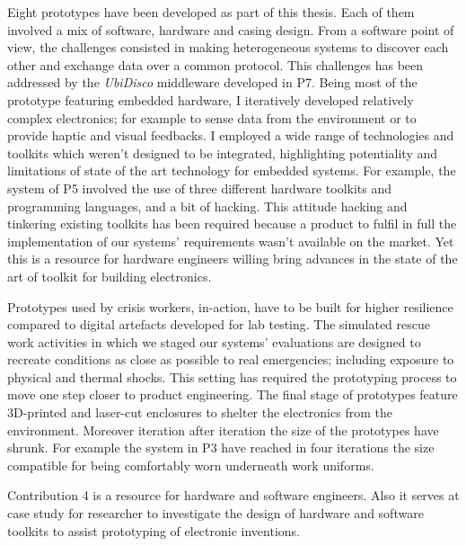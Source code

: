 Eight prototypes have been developed as part of this thesis. Each of them involved a mix of software, hardware and casing design. From a software point of view, the challenges consisted in making heterogeneous systems to discover each other and exchange data over a common protocol. This challenges has been addressed by the \emph{UbiDisco} middleware developed in P7. Being most of the prototype featuring embedded hardware, I iteratively developed relatively complex electronics; for example to sense data from the environment or to provide haptic and visual feedbacks. I employed a wide range of technologies and toolkits which weren't designed to be integrated, highlighting potentiality and limitations of state of the art technology for embedded systems. For example, the system of P5 involved the use of three different hardware toolkits and programming languages, and a bit of hacking. This attitude hacking and tinkering existing toolkits has been required because a product to fulfil in full the implementation of our systems' requirements wasn't available on the market. Yet this is a resource for hardware engineers willing bring advances in the state of the art of toolkit for building electronics.

Prototypes used by crisis workers, in-action, have to be built for higher resilience compared to digital artefacts developed for lab testing. The simulated rescue work activities in which we staged our systems' evaluations are designed to recreate conditions as close as possible to real emergencies; including exposure to physical and thermal shocks. This setting has required the prototyping process to move one step closer to product engineering. The final stage of prototypes feature 3D-printed and laser-cut enclosures to shelter the electronics from the environment. Moreover iteration after iteration the size of the prototypes have shrunk. For example the system in P3 have reached in four iterations the size compatible for being comfortably worn underneath work uniforms.

Contribution 4 is a resource for hardware and software engineers. Also it serves at case study for researcher to investigate the design of hardware and software toolkits to assist prototyping of electronic inventions. 
